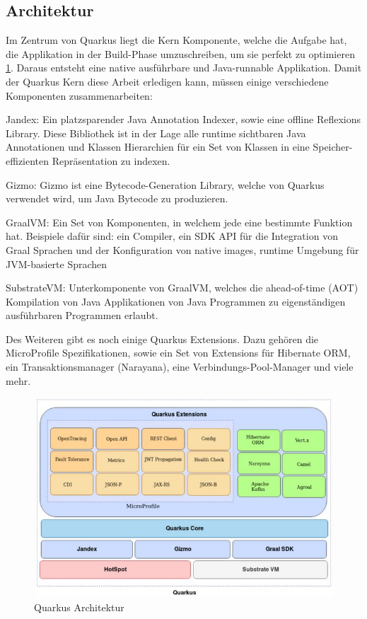 \subsection{Architektur}
Im Zentrum von Quarkus liegt die Kern Komponente, welche die Aufgabe hat, die Applikation in der Build-Phase umzuschreiben, um sie perfekt zu optimieren \ref{fig:impl:QuarkusArchitektur}. Daraus entsteht eine native ausführbare und Java-runnable Applikation. Damit der Quarkus Kern diese Arbeit erledigen kann, müssen einige verschiedene Komponenten zusammenarbeiten: 

\begin{compactitem}
    \item Jandex: Ein platzsparender Java Annotation Indexer, sowie eine offline Reflexions Library. Diese Bibliothek ist in der Lage alle runtime sichtbaren Java Annotationen und Klassen Hierarchien für ein Set von Klassen in eine Speicher-effizienten Repräsentation zu indexen.     
    \item Gizmo: Gizmo ist eine Bytecode-Generation Library, welche von Quarkus verwendet wird, um Java Bytecode zu produzieren.             
    \item GraalVM: Ein Set von Komponenten, in welchem jede eine bestimmte Funktion hat. Beispiele dafür sind: ein Compiler, ein SDK API für die Integration von Graal Sprachen und der Konfiguration von native images, runtime Umgebung für JVM-basierte Sprachen
    \item SubstrateVM: Unterkomponente von GraalVM, welches die ahead-of-time (AOT) Kompilation von Java Applikationen von Java Programmen zu eigenständigen ausführbaren Programmen erlaubt.
\end{compactitem}

Des Weiteren gibt es noch einige Quarkus Extensions. Dazu gehören die MicroProfile Spezifikationen, sowie ein Set von Extensions für Hibernate ORM, ein Transaktionsmanager (Narayana), eine Verbindungs-Pool-Manager und viele mehr. 

\begin{figure}
    \centering
    \includegraphics[scale=0.9]{pics/quarkusArchitektur.JPG}
    \caption{Quarkus Architektur}
    \label{fig:impl:QuarkusArchitektur}
\end{figure}

